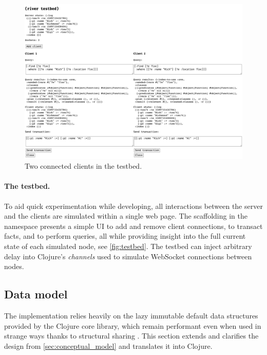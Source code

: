 \cleardoublepage
\begin{figure}[!ht]
  \includegraphics[width=0.9\linewidth]{images/testbed.png}
  \caption{Two connected clients in the testbed.}
  \label{fig:testbed}
\end{figure}

\paragraph{The testbed.} To aid quick experimentation while developing, all interactions between the server and the clients are simulated within a single web page. The scaffolding in the  namespace presents a simple UI to add and remove client connections, to transact facts, and to perform queries, all while providing insight into the full current state of each simulated node, see \autoref{fig:testbed}. The testbed can inject arbitrary delay into Clojure's  \emph{channels} used to simulate WebSocket connections between nodes.

\subsection{Data model}\label{sec:impl_datamodel}
The implementation relies heavily on the lazy immutable default data structures \cite{hickey2009persistent} provided by the Clojure core library, which remain performant even when used in strange ways thanks to structural sharing \cite{okasaki1999purely}. This section extends and clarifies the design from \autoref{sec:conceptual_model} and translates it into Clojure.

